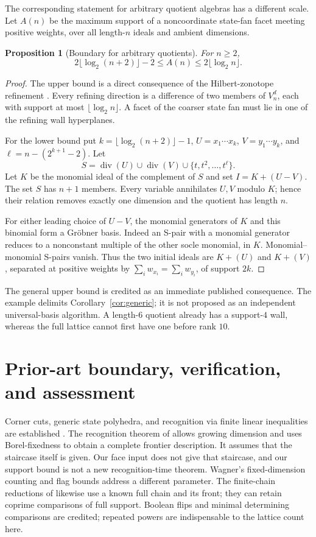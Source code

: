\documentclass[11pt,a4paper]{article}
\newtheorem{proposition}[theorem]{Proposition}
\theoremstyle{remark}\newtheorem{remark}[theorem]{Remark}
\newcommand{\fl}[1]{\lfloor#1\rfloor}
\begin{document}
The corresponding statement for arbitrary quotient algebras has
a different scale. Let \(A(n)\) be the maximum support of a
noncoordinate state-fan facet meeting positive weights, over
all length-\(n\) ideals and ambient dimensions.

\begin{proposition}[Boundary for arbitrary quotients]\label{prop:quotient}
For \(n\geq2\),
\[
 2\fl{\log_2(n+2)}-2\leq A(n)\leq2\fl{\log_2 n}.
\]
\end{proposition}
\begin{proof}
The upper bound is a direct consequence of the
Hilbert-zonotope refinement \cite[Proposition 3.2 and
Theorem 3.5]{BOT03}. Every refining direction is a difference
of two members of \(V_n^d\), each with support at most
\(\fl{\log_2 n}\). A facet of the coarser state fan must
lie in one of the refining wall hyperplanes.

For the lower bound put \(k=\fl{\log_2(n+2)}-1\),
\(U=x_1\cdots x_k\), \(V=y_1\cdots y_k\), and
\(\ell=n-(2^{k+1}-2)\). Let
\[
 S=\operatorname{div}(U)\cup\operatorname{div}(V)
            \cup\{t,t^2,\ldots,t^\ell\}.
\]
Let \(K\) be the monomial ideal of the complement of \(S\)
and set \(I=K+(U-V)\). The set \(S\) has \(n+1\) members.
Every variable annihilates \(U,V\) modulo \(K\);
hence their relation removes exactly one dimension and
the quotient has length \(n\).

For either leading choice of \(U-V\), the monomial
generators of \(K\) and this binomial form a Gr\"obner basis.
Indeed an S-pair with a monomial generator reduces to a
nonconstant multiple of the other socle monomial, in \(K\).
Monomial--monomial S-pairs vanish. Thus the two initial
ideals are \(K+(U)\) and \(K+(V)\), separated at positive
weights by
\(\sum_iw_{x_i}=\sum_iw_{y_i}\), of support \(2k\).
\end{proof}
The general upper bound is credited as an immediate published
consequence. The example delimits Corollary~\ref{cor:generic};
it is not proposed as an independent universal-basis algorithm.
A length-\(6\) quotient already has a support-\(4\) wall,
whereas the full lattice cannot first have one before rank \(10\).

\section{Prior-art boundary, verification, and assessment}
Corner cuts, generic state polyhedra, and recognition via finite
linear inequalities are established \cite{OS99,BOT03}.
The recognition theorem of \cite[Section 3]{OS99} allows growing
dimension and uses Borel-fixedness to obtain a complete
frontier description. It assumes that the staircase itself is
given. Our face input does not give that staircase, and our
support bound is not a new recognition-time theorem.
Wagner's fixed-dimension counting and flag bounds \cite{W02}
address a different parameter. The finite-chain reductions of
\cite[Sections 5--6]{VP09} likewise use a known full chain and
its front; they can retain coprime comparisons of full support.
Boolean flips and minimal determining comparisons
\cite{M99,CCS} are credited; repeated powers are indispensable
to the lattice count here.
\end{document}
